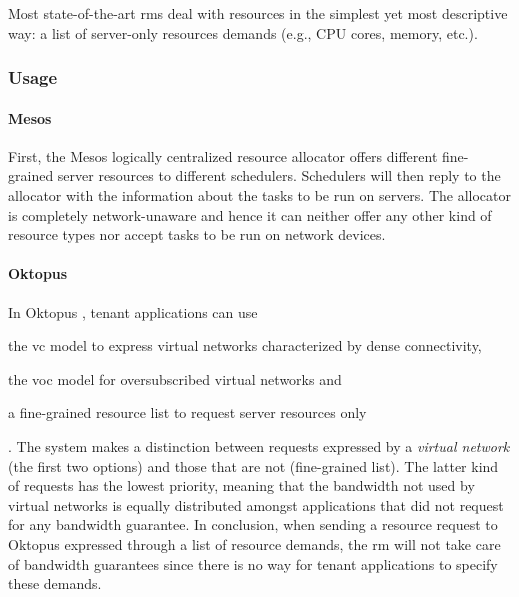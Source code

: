 Most state-of-the-art \glspl{rm} \cite{mesos, borg, omega, kubernetes, yarn} deal with resources in the simplest yet most descriptive way: a list of server-only resources demands (e.g., CPU cores, memory, etc.).

\subsubsection{Usage}
\paragraph{Mesos \texorpdfstring{\cite{mesos}}{}}
First, the Mesos \cite{mesos} logically centralized resource allocator offers different fine-grained server resources to different schedulers.
Schedulers will then reply to the allocator with the information about the tasks to be run on servers.
The allocator is completely network-unaware and hence it can neither offer any other kind of resource types nor accept tasks to be run on network devices.

\paragraph{Oktopus \texorpdfstring{\cite{oktopus}}{}}
In Oktopus \cite{oktopus}, tenant applications can use
\begin{mylist}
    \item the \gls{vc} model to express virtual networks characterized by dense connectivity,
    \item the \gls{voc} model for oversubscribed virtual networks and
    \item a fine-grained resource list to request server resources only
\end{mylist}.
The system makes a distinction between requests expressed by a \textit{virtual network} (the first two options) and those that are not (fine-grained list).
The latter kind of requests has the lowest priority, meaning that the bandwidth not used by virtual networks is equally distributed amongst applications that did not request for any bandwidth guarantee.
In conclusion, when sending a resource request to Oktopus \cite{oktopus} expressed through a list of resource demands, the \gls{rm} will not take care of bandwidth guarantees since there is no way for tenant applications to specify these demands.

